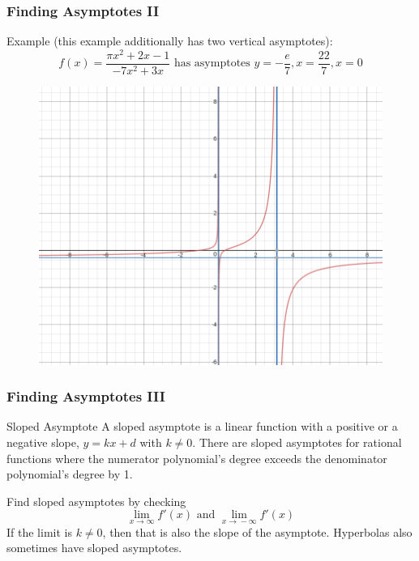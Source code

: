\documentclass[xcolor=dvipsnames]{beamer}
\begin{document}
\begin{frame}
  \frametitle{Finding Asymptotes II}
Example (this example additionally has two
  vertical asymptotes):
\begin{equation}
  \label{eq:ahyoimij}
  f(x)=\frac{\pi{}x^{2}+2x-1}{-7x^{2}+3x}\mbox{ has asymptotes }y=-\frac{e}{7},x=\frac{22}{7},x=0
\end{equation}
\begin{figure}[h]
\includegraphics[scale=.25]{./diagrams/asymp4.png}
\end{figure}
\end{frame}

\begin{frame}
  \frametitle{Finding Asymptotes III}
\begin{block}{Sloped Asymptote}
  A sloped asymptote is a linear function with a positive or a
  negative slope, $y=kx+d$ with $k\neq{}0$. There are sloped
  asymptotes for rational functions where the numerator polynomial's
  degree exceeds the denominator polynomial's degree by 1.
\end{block}
Find sloped asymptotes by checking
\begin{equation}
  \label{eq:uzuwooba}
  \lim_{x\rightarrow\infty}f'(x)\mbox{ and }\lim_{x\rightarrow{}-\infty}f'(x)
\end{equation}
If the limit is $k\neq{}0$, then that is also the slope of the
asymptote. Hyperbolas also sometimes have sloped asymptotes. 
\end{frame}
\end{document}
